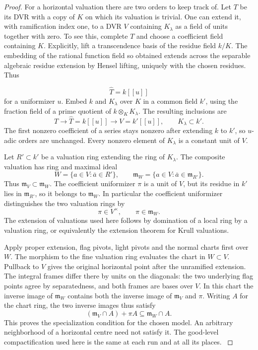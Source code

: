 \begin{proof}
For a horizontal valuation there are two orders to keep track
of. Let \(T\) be its DVR with a copy of \(K\) on which its
valuation is trivial. One can extend it, with ramification
index one, to a DVR \(V\) containing \(K_\lambda\) as a
field of units together with zero. To see this, complete \(T\)
and choose a coefficient field containing \(K\). Explicitly,
lift a transcendence basis of the residue field \(k/K\).
The embedding of the rational function field so obtained
extends across the separable algebraic residue extension by
Hensel lifting, uniquely with the chosen residues. Thus

\[
  \widehat T=k[[u]]
\]
 for a uniformizer \(u\).
Embed \(k\) and \(K_\lambda\) over \(K\) in a common field \(k'\), using the fraction field of a prime quotient of \(k\otimes_K K_\lambda\). The resulting inclusions are
\[
       T\longrightarrow\widehat T=k[[u]]
          \longrightarrow V=k'[[u]],\qquad K_\lambda\subset k'.
\]
The first nonzero coefficient of a series stays nonzero after extending \(k\) to \(k'\), so \(u\)-adic orders are unchanged. Every nonzero element of \(K_\lambda\) is a constant unit of \(V\).

Let \(R'\subset k'\) be a valuation ring extending the ring of \(K_\lambda\).
The composite valuation has ring and maximal ideal
\[
 W=\{a\in V:\bar a\in R'\},\qquad
 \mathfrak m_W=\{a\in V:\bar a\in\mathfrak m_{R'}\}.
\]
Thus \(\mathfrak m_V\subset\mathfrak m_W\). The
coefficient uniformizer \(\pi\) is a unit of \(V\), but its
residue in \(k'\) lies in \(\mathfrak m_{R'}\), so it belongs
to \(\mathfrak m_W\).
In particular the coefficient uniformizer distinguishes the two valuation rings by
\[
  \pi\in V^\times,\qquad \pi\in\mathfrak m_W .
\]
The extension of valuations used here follows by domination of
a local ring by a valuation ring, or equivalently the extension
theorem for Krull valuations.

Apply proper extension, flag pivots, light pivots and the normal
charts first over \(W\). The morphism to the fine valuation ring
evaluates the chart in \(W\subset V\). Pullback to \(V\) gives
the original horizontal point after the unramified extension.
The integral frames differ there by units on the diagonals:
the two underlying flag points agree by separatedness, and both
frames are bases over \(V\). In this chart the inverse image of
\(\mathfrak m_W\) contains both the inverse image of
\(\mathfrak m_V\) and \(\pi\).
Writing \(A\) for the chart ring, the two inverse images thus satisfy
\[
  (\mathfrak m_V\cap A)+\pi A\subseteq\mathfrak m_W\cap A .
\]
 This proves the specialization condition for the chosen model. An arbitrary neighborhood of a horizontal centre need not satisfy it.
The good-level compactification used here is the same at each
run and at all its places. \label{cor:slice-metrics-3}


\end{proof}
